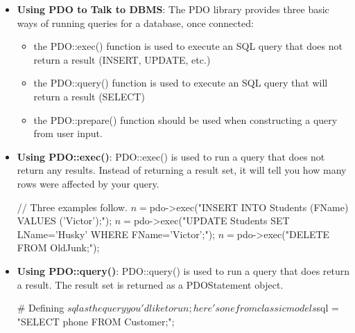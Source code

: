 \documentclass{report}
\begin{document}
\begin{itemize}
        \item \textbf{Using PDO to Talk to DBMS}: The PDO library provides three basic ways of running queries for a database, once connected:
            \begin{itemize}
                \item the PDO::exec() function is used to execute an SQL query that does not return a result (INSERT, UPDATE, etc.)
                \item the PDO::query() function is used to execute an SQL query that will return a result (SELECT)
                \item the PDO::prepare() function should be used when constructing a query from user input.
            \end{itemize}
        \item \textbf{Using PDO::exec()}: PDO::exec() is used to run a query that does not return any results. Instead of returning a result set, it will tell you how many rows were affected by your query.
            \bigbreak \noindent 
            \begin{bashcode}
                // Three examples follow.
                $n = $pdo->exec("INSERT INTO Students (FName) VALUES ('Victor');");
                $n = $pdo->exec("UPDATE Students SET LName='Husky' WHERE FName='Victor';");
                $n = $pdo->exec("DELETE FROM OldJunk;");
            \end{bashcode}
        \item \textbf{Using PDO::query()}: PDO::query() is used to run a query that does return a result. The result set is returned as a PDOStatement object.
            \bigbreak \noindent 
            \begin{bashcode}
                # Defining $sql as the query you'd like to run; here's one from classicmodels
                $sql = "SELECT phone FROM Customer;";


\end{bashcode}
\end{itemize}
\end{document}
